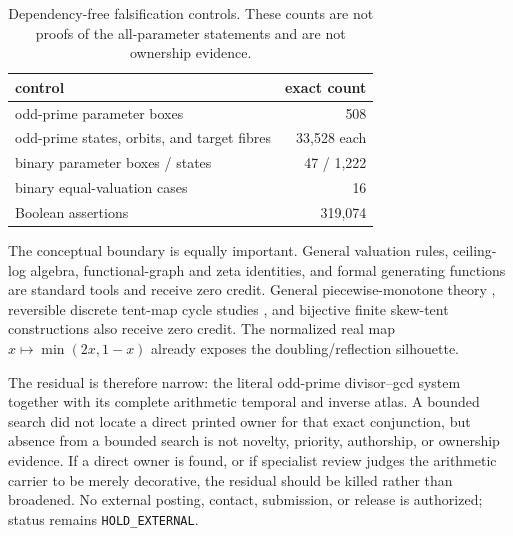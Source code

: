 \documentclass[10pt,a4paper]{amsart}
\theoremstyle{definition}
\theoremstyle{remark}
\begin{document}
\begin{table}[!htbp]
\centering
\small
\begin{tabular}{@{}lr@{}}
\toprule
control & exact count \\
\midrule
odd-prime parameter boxes & 508 \\
odd-prime states, orbits, and target fibres & 33,528 each \\
binary parameter boxes / states & 47 / 1,222 \\
binary equal-valuation cases & 16 \\
Boolean assertions & 319,074 \\
\bottomrule
\end{tabular}
\caption{Dependency-free falsification controls.  These counts are not
proofs of the all-parameter statements and are not ownership evidence.}
\label{tab:controls}
\end{table}

The conceptual boundary is equally important.  General valuation rules,
ceiling-log algebra, functional-graph and zeta identities, and formal
generating functions are standard tools and receive zero credit.  General
piecewise-monotone theory \citep{MilnorThurston1988}, reversible discrete
tent-map cycle studies \citep{Kuzovlev2004}, and bijective finite skew-tent
constructions \citep{ChoiEtAl2026} also receive zero credit.  The normalized
real map $x\mapsto\min(2x,1-x)$ already exposes the doubling/reflection
silhouette.

The residual is therefore narrow: the literal odd-prime divisor--gcd system
together with its complete arithmetic temporal and inverse atlas.  A bounded
search did not locate a direct printed owner for that exact conjunction, but
absence from a bounded search is not novelty, priority, authorship, or
ownership evidence.  If a direct owner is found, or if specialist review
judges the arithmetic carrier to be merely decorative, the residual should be
killed rather than broadened.  No external posting, contact, submission, or
release is authorized; status remains \texttt{HOLD\_EXTERNAL}.



\end{document}
